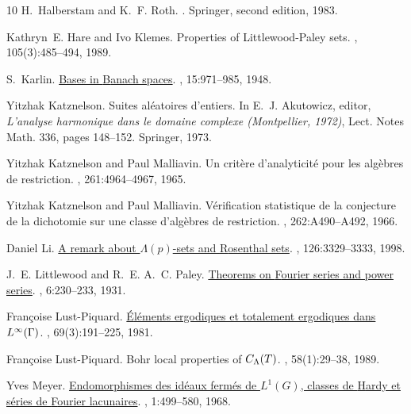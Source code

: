 \documentclass[a4paper]{article}
\begin{document}
\begin{thebibliography}{10}
H.~Halberstam and K.~F. Roth.
.
\newblock Springer, second edition, 1983.

Kathryn~E. Hare and Ivo Klemes.
\newblock Properties of {L}ittlewood-{P}aley sets.
, 105(3):485--494, 1989.

S.~Karlin.
\newblock \href{http://dx.doi.org/10.1215/S0012-7094-48-01587-7} {Bases in
  {B}anach spaces}.
, 15:971--985, 1948.

Yitzhak Katznelson.
\newblock Suites al\'eatoires d'entiers.
\newblock In E.~J. Akutowicz, editor, {\em L'analyse harmonique dans le domaine
  complexe (Montpellier, 1972)}, Lect. Notes Math. 336, pages 148--152.
  Springer, 1973.

Yitzhak Katznelson and Paul Malliavin.
\newblock Un crit\`ere d'analyticit\'e pour les alg\`ebres de restriction.
, 261:4964--4967, 1965.

Yitzhak Katznelson and Paul Malliavin.
\newblock V\'erification statistique de la conjecture de la dichotomie sur une
  classe d'alg\`ebres de restriction.
, 262:A490--A492, 1966.

Daniel Li.
\newblock \href{http://dx.doi.org/10.1090/S0002-9939-98-04455-4} {A remark
  about ${\Lambda}(p)$-sets and {R}osenthal sets}.
, 126:3329--3333, 1998.

J.~E. Littlewood and R.~E. A.~C. Paley.
\newblock \href{http://dx.doi.org/10.1112/jlms/s1-6.3.230} {Theorems on
  {F}ourier series and power series}.
, 6:230--233, 1931.

Fran{\c{c}}oise Lust-Piquard.
\newblock \href{http://matwbn.icm.edu.pl/ksiazki/sm/sm69/sm69117.pdf}
  {{\'{E}}l\'ements ergodiques et totalement ergodiques dans
  ${L}\sp{\infty}({\Gamma})$}.
, 69(3):191--225, 1981.

Fran{\c{c}}oise Lust-Piquard.
\newblock Bohr local properties of ${C}\sb {\Lambda}({T})$.
, 58(1):29--38, 1989.

Yves Meyer.
\newblock \href{http://www.numdam.org/item?id=ASENS_1968_4_1_4_499_0}
  {Endomorphismes des id\'eaux ferm\'es de {$L^1(G)$}, classes de {H}ardy et
  s\'eries de {F}ourier lacunaires}.
, 1:499--580, 1968.


\end{thebibliography}
\end{document}
